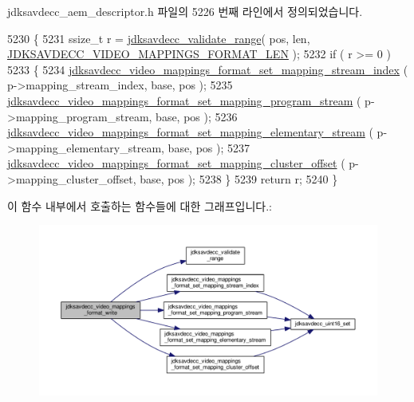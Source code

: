 jdksavdecc\+\_\+aem\+\_\+descriptor.\+h 파일의 5226 번째 라인에서 정의되었습니다.


\begin{DoxyCode}
5230 \{
5231     ssize\_t r = \hyperlink{group__util_ga9c02bdfe76c69163647c3196db7a73a1}{jdksavdecc\_validate\_range}( pos, len, 
      \hyperlink{group__video__mappings__format_gabb8ba2fa0ffcfce879a8694568f54ded}{JDKSAVDECC\_VIDEO\_MAPPINGS\_FORMAT\_LEN} );
5232     \textcolor{keywordflow}{if} ( r >= 0 )
5233     \{
5234         \hyperlink{group__video__mappings__format_gad6beea5847683de110d27fe15650e9db}{jdksavdecc\_video\_mappings\_format\_set\_mapping\_stream\_index}
      ( p->mapping\_stream\_index, base, pos );
5235         \hyperlink{group__video__mappings__format_ga281fcb187709a7fa377ff66a49b95e76}{jdksavdecc\_video\_mappings\_format\_set\_mapping\_program\_stream}
      ( p->mapping\_program\_stream, base, pos );
5236         \hyperlink{group__video__mappings__format_ga6f4ad00b46e6cb49cc53777de9fe5af6}{jdksavdecc\_video\_mappings\_format\_set\_mapping\_elementary\_stream}
      ( p->mapping\_elementary\_stream, base, pos );
5237         \hyperlink{group__video__mappings__format_gabc742cbe6f3c03eca073a8e47b0aabab}{jdksavdecc\_video\_mappings\_format\_set\_mapping\_cluster\_offset}
      ( p->mapping\_cluster\_offset, base, pos );
5238     \}
5239     \textcolor{keywordflow}{return} r;
5240 \}
\end{DoxyCode}


이 함수 내부에서 호출하는 함수들에 대한 그래프입니다.\+:
\nopagebreak
\begin{figure}[H]
\begin{center}
\leavevmode
\includegraphics[width=350pt]{group__video__mappings__format_gae3218fb11dbe5d46cc96cbb284666a37_cgraph}
\end{center}
\end{figure}


